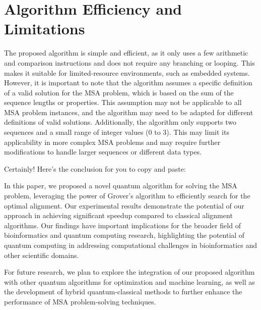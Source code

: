 \section{Algorithm Efficiency and Limitations}

The proposed algorithm is simple and efficient, as it only uses a few arithmetic and comparison instructions and does not require any branching or looping. This makes it suitable for limited-resource environments, such as embedded systems. However, it is important to note that the algorithm assumes a specific definition of a valid solution for the MSA problem, which is based on the sum of the sequence lengths or properties. This assumption may not be applicable to all MSA problem instances, and the algorithm may need to be adapted for different definitions of valid solutions. Additionally, the algorithm only supports two sequences and a small range of integer values (0 to 3). This may limit its applicability in more complex MSA problems and may require further modifications to handle larger sequences or different data types.

Certainly! Here's the conclusion for you to copy and paste:

In this paper, we proposed a novel quantum algorithm for solving the MSA problem, leveraging the power of Grover's algorithm to efficiently search for the optimal alignment. Our experimental results demonstrate the potential of our approach in achieving significant speedup compared to classical alignment algorithms. Our findings have important implications for the broader field of bioinformatics and quantum computing research, highlighting the potential of quantum computing in addressing computational challenges in bioinformatics and other scientific domains.

For future research, we plan to explore the integration of our proposed algorithm with other quantum algorithms for optimization and machine learning, as well as the development of hybrid quantum-classical methods to further enhance the performance of MSA problem-solving techniques.

